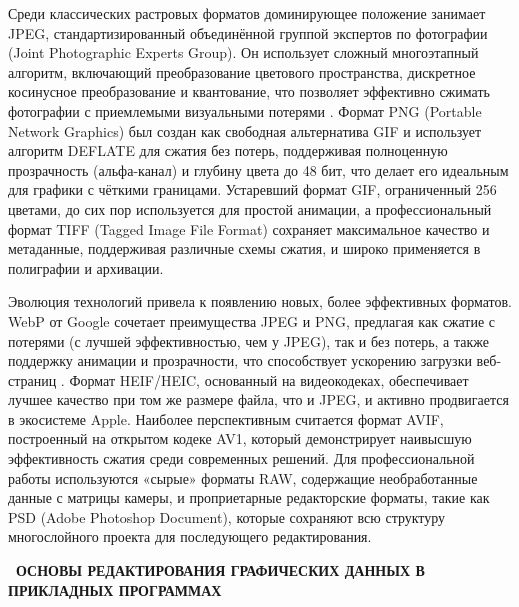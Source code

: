 \documentclass{SibFU-docs}
\begin{document}

Среди классических растровых форматов доминирующее положение занимает JPEG, стандартизированный объединённой группой экспертов по фотографии (Joint Photographic Experts Group). Он использует сложный многоэтапный алгоритм, включающий преобразование цветового пространства, дискретное косинусное преобразование и квантование, что позволяет эффективно сжимать фотографии с приемлемыми визуальными потерями \cite{jpeg-standard}. Формат PNG (Portable Network Graphics) был создан как свободная альтернатива GIF и использует алгоритм DEFLATE для сжатия без потерь, поддерживая полноценную прозрачность (альфа-канал) и глубину цвета до 48 бит, что делает его идеальным для графики с чёткими границами. Устаревший формат GIF, ограниченный 256 цветами, до сих пор используется для простой анимации, а профессиональный формат TIFF (Tagged Image File Format) сохраняет максимальное качество и метаданные, поддерживая различные схемы сжатия, и широко применяется в полиграфии и архивации.


Эволюция технологий привела к появлению новых, более эффективных форматов. WebP от Google сочетает преимущества JPEG и PNG, предлагая как сжатие с потерями (с лучшей эффективностью, чем у JPEG), так и без потерь, а также поддержку анимации и прозрачности, что способствует ускорению загрузки веб-страниц \cite{webp-guide}. Формат HEIF/HEIC, основанный на видеокодеках, обеспечивает лучшее качество при том же размере файла, что и JPEG, и активно продвигается в экосистеме Apple. Наиболее перспективным считается формат AVIF, построенный на открытом кодеке AV1, который демонстрирует наивысшую эффективность сжатия среди современных решений. Для профессиональной работы используются «сырые» форматы RAW, содержащие необработанные данные с матрицы камеры, и проприетарные редакторские форматы, такие как PSD (Adobe Photoshop Document), которые сохраняют всю структуру многослойного проекта для последующего редактирования.

\newpage
{}
\begin{center}\textbf{\thesection\ ОСНОВЫ РЕДАКТИРОВАНИЯ ГРАФИЧЕСКИХ ДАННЫХ В ПРИКЛАДНЫХ ПРОГРАММАХ}\end{center}
\vspace*{-1.5em}
\end{document}
